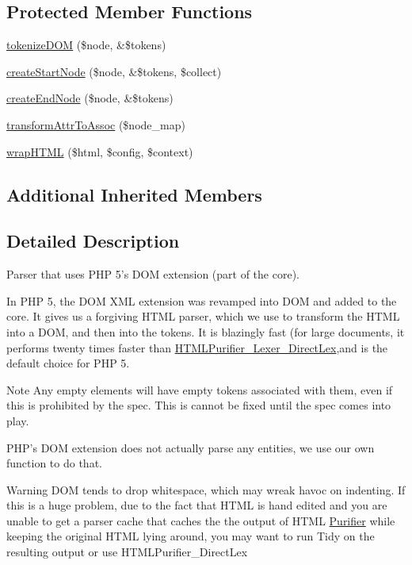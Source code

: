 \subsection*{Protected Member Functions}
\begin{DoxyCompactItemize}
\item 
\hyperlink{classHTMLPurifier__Lexer__DOMLex_ae921401c6a1a96192c74f6dae9aead45}{tokenize\+D\+O\+M} (\$node, \&\$tokens)
\item 
\hyperlink{classHTMLPurifier__Lexer__DOMLex_af46c88c31c1a1622e5673285649652db}{create\+Start\+Node} (\$node, \&\$tokens, \$collect)
\item 
\hyperlink{classHTMLPurifier__Lexer__DOMLex_a3bac0ab4dc317519030dcc778452197f}{create\+End\+Node} (\$node, \&\$tokens)
\item 
\hyperlink{classHTMLPurifier__Lexer__DOMLex_ae034cd442c154ff7e80edfb5816b501b}{transform\+Attr\+To\+Assoc} (\$node\+\_\+map)
\item 
\hyperlink{classHTMLPurifier__Lexer__DOMLex_a662e171325d18acfedf389b7bb91d9df}{wrap\+H\+T\+M\+L} (\$html, \$config, \$context)
\end{DoxyCompactItemize}
\subsection*{Additional Inherited Members}


\subsection{Detailed Description}
Parser that uses P\+H\+P 5's D\+O\+M extension (part of the core).

In P\+H\+P 5, the D\+O\+M X\+M\+L extension was revamped into D\+O\+M and added to the core. It gives us a forgiving H\+T\+M\+L parser, which we use to transform the H\+T\+M\+L into a D\+O\+M, and then into the tokens. It is blazingly fast (for large documents, it performs twenty times faster than \hyperlink{classHTMLPurifier__Lexer__DirectLex}{H\+T\+M\+L\+Purifier\+\_\+\+Lexer\+\_\+\+Direct\+Lex},and is the default choice for P\+H\+P 5.

\begin{DoxyNote}{Note}
Any empty elements will have empty tokens associated with them, even if this is prohibited by the spec. This is cannot be fixed until the spec comes into play.

P\+H\+P's D\+O\+M extension does not actually parse any entities, we use our own function to do that.
\end{DoxyNote}
\begin{DoxyWarning}{Warning}
D\+O\+M tends to drop whitespace, which may wreak havoc on indenting. If this is a huge problem, due to the fact that H\+T\+M\+L is hand edited and you are unable to get a parser cache that caches the the output of H\+T\+M\+L \hyperlink{classPurifier}{Purifier} while keeping the original H\+T\+M\+L lying around, you may want to run Tidy on the resulting output or use H\+T\+M\+L\+Purifier\+\_\+\+Direct\+Lex 
\end{DoxyWarning}


